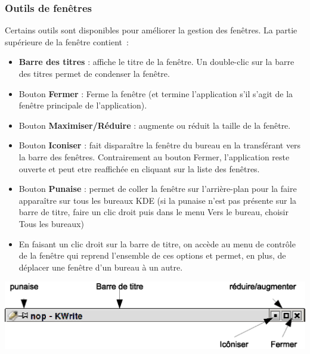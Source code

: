 \documentclass[12pt,a4paper]{article}
\begin{document}
\subsubsection{Outils de fenêtres}
    Certains outils sont disponibles pour améliorer la gestion des
    fenêtres. La partie supérieure de la fenêtre contient~: 

    \begin{itemize}
    \item {\bf Barre des titres} : affiche le titre de la fenêtre. Un
      double-clic sur la barre des titres permet de condenser la
      fenêtre.

    \item Bouton {\bf Fermer} : Ferme la fenêtre (et termine l'application
      s'il s'agit de la fenêtre principale de l'application).

    \item Bouton {\bf Maximiser/Réduire} : augmente ou réduit la taille de
      la fenêtre.
    \item Bouton {\bf Iconiser} : fait disparaître la fenêtre du
      bureau en la transférant vers la barre des
      fenêtres. Contrairement au bouton Fermer, l'application reste
      ouverte et peut etre reaffichée en cliquant sur la liste des
      fenêtres.


    \item Bouton {\bf Punaise} : permet de coller la fenêtre sur
      l'arrière-plan pour la faire apparaître sur tous les bureaux KDE
      (si la punaise n'est pas présente sur la barre de titre, faire
      un clic droit puis dans le menu Vers le bureau, choisir Tous les
      bureaux)

    \item En faisant un clic droit sur la barre de titre, on accède au
      menu de contrôle de la fenêtre qui reprend l'ensemble de ces
      options et permet, en plus, de déplacer une fenêtre d'un bureau
      à un autre.
    \end{itemize}



    \begin{center}
      \includegraphics{img/barre.eps}
    \end{center}
\end{document}

